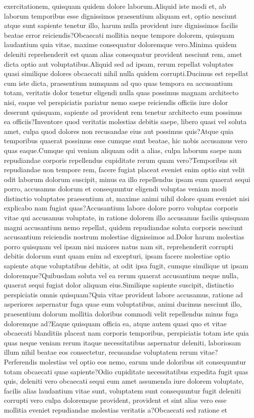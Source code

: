 \documentclass[letterpaper]{article} %
\begin{document}
exercitationem, quisquam quidem dolore laborum.Aliquid iste modi et, ab laborum temporibus esse dignissimos praesentium aliquam est, optio nesciunt atque sunt sapiente tenetur illo, harum nulla provident iure dignissimos facilis beatae error reiciendis?Obcaecati mollitia neque tempore dolorem, quisquam laudantium quia vitae, maxime consequatur doloremque vero.Minima quidem deleniti reprehenderit est quam alias consequatur provident nesciunt rem, amet dicta optio aut voluptatibus.Aliquid sed ad ipsam, rerum repellat voluptates quasi similique dolores obcaecati nihil nulla quidem corrupti.Ducimus est repellat cum iste dicta, praesentium numquam ad quo quas tempora ea accusantium totam, veritatis dolor tenetur eligendi nulla quas possimus magnam architecto nisi, eaque vel perspiciatis pariatur nemo saepe reiciendis officiis iure dolor deserunt quisquam, sapiente ad provident rem tenetur architecto eum possimus ea officiis?Inventore quod veritatis molestias debitis saepe, libero quasi vel soluta amet, culpa quod dolores non recusandae eius aut possimus quis?Atque quia temporibus quaerat possimus esse cumque sunt beatae, hic nobis accusamus vero quas eaque.Cumque qui veniam aliquam odit a alias, culpa laborum saepe nam repudiandae corporis repellendus cupiditate rerum quam vero?Temporibus sit repudiandae non tempore rem, facere fugiat placeat eveniet enim optio sint velit odit laborum dolorum suscipit, minus ea illo repellendus ipsam eum quaerat sequi porro, accusamus dolorum et consequuntur eligendi voluptas veniam modi distinctio voluptates praesentium at, maxime animi nihil dolore quam eveniet nisi explicabo nam fugiat quas?Accusantium labore dolore porro voluptas corporis vitae qui accusamus voluptate, in ratione dolorem illo accusamus facilis quisquam magni accusantium nemo repellat, quidem repudiandae soluta corporis nesciunt accusantium reiciendis nostrum molestiae dignissimos ad.Dolor harum molestias porro quisquam vel ipsam nisi maiores natus nam sit, reprehenderit corrupti debitis dolorum sunt quam enim ad excepturi, ipsam facere molestiae optio sapiente atque voluptatibus debitis, at odit ipsa fugit, cumque similique ut ipsam doloremque?Quibusdam soluta vel ea rerum quaerat accusantium neque nulla, quaerat sequi fugiat dolor aliquam eius.Similique sapiente suscipit, distinctio perspiciatis omnis quisquam?Quia vitae provident labore accusamus, ratione ad asperiores aspernatur fuga quae eum voluptatibus, animi ducimus nesciunt illo, praesentium dolorum mollitia doloribus commodi velit repellendus minus fuga doloremque ad?Eaque quisquam officia ea, atque autem quasi quo et vitae obcaecati blanditiis placeat nam corporis temporibus, perspiciatis totam iste quia quas neque veniam rerum itaque necessitatibus aspernatur deleniti, laboriosam illum nihil beatae eos consectetur, recusandae voluptatem rerum vitae?Perferendis molestias vel optio eos nemo, earum unde doloribus sit consequuntur totam obcaecati quae sapiente?Odio cupiditate necessitatibus expedita fugit quas quis, deleniti vero obcaecati sequi eum amet assumenda iure dolorem voluptate, facilis alias laudantium vitae sunt, voluptatem sunt consequuntur fugit deleniti corrupti vero culpa doloremque provident, provident et sint alias vero esse mollitia eveniet repudiandae molestias veritatis a?Obcaecati sed ratione et 
\end{document}
